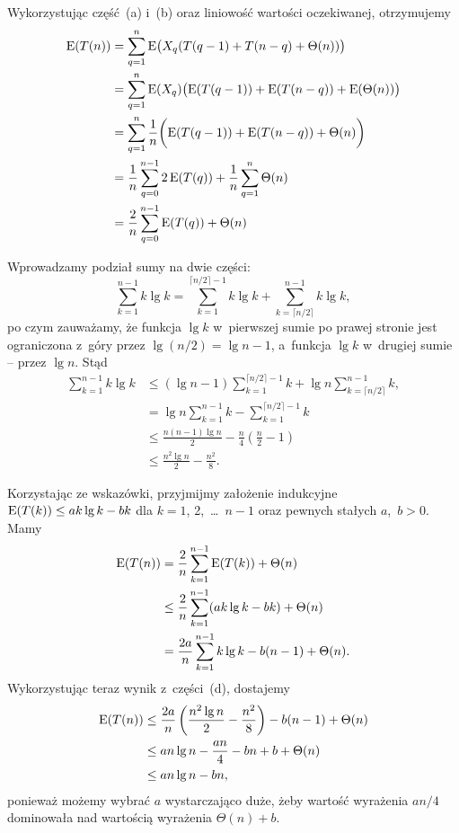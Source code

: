 \subproblem %
Wykorzystując część~(a) i~(b) oraz liniowość wartości oczekiwanej, otrzymujemy
\begin{align*}
	\operatorname{E}(T(n)) &= \sum_{q=1}^n\operatorname{E}\bigl(X_q(T(q-1)+T(n-q)+\Theta(n))\bigr) \\
	&= \sum_{q=1}^n\operatorname{E}(X_q)\bigl(\operatorname{E}(T(q-1))+\operatorname{E}(T(n-q))+\operatorname{E}(\Theta(n))\bigr) \\
	&= \sum_{q=1}^n\frac{1}{n}\biggl(\operatorname{E}(T(q-1))+\operatorname{E}(T(n-q))+\Theta(n)\biggr) \\
	&= \frac{1}{n}\sum_{q=0}^{n-1}2\operatorname{E}(T(q))+\frac{1}{n}\sum_{q=1}^n\Theta(n) \\
	&= \frac{2}{n}\sum_{q=0}^{n-1}\operatorname{E}(T(q))+\Theta(n)
\end{align*}

\subproblem %
Wprowadzamy podział sumy na dwie części:
\[
	\sum_{k=1}^{n-1}k\lg k = \sum_{k=1}^{\lceil n/2\rceil-1}k\lg k+\sum_{k=\lceil n/2\rceil}^{n-1}k\lg k,
\]
po czym zauważamy, że funkcja $\lg k$ w~pierwszej sumie po prawej stronie jest ograniczona z~góry przez $\lg(n/2)=\lg n-1$, a~funkcja $\lg k$ w~drugiej sumie -- przez $\lg n$. Stąd
\begin{align*}
	\sum_{k=1}^{n-1}k\lg k &\le (\lg n-1)\sum_{k=1}^{\lceil n/2\rceil-1}k+\lg n\sum_{k=\lceil n/2\rceil}^{n-1}k, \\
	&= \lg n\sum_{k=1}^{n-1}k-\sum_{k=1}^{\lceil n/2\rceil-1}k \\[2mm]
	&\le \frac{n(n-1)\lg n}{2}-\frac{n}{4}\left(\frac{n}{2}-1\right) \\[1mm]
	&\le \frac{n^2\lg n}{2}-\frac{n^2}{8}.
\end{align*}

\subproblem %

\noindent Korzystając ze wskazówki, przyjmijmy założenie indukcyjne $\operatorname{E}(T(k))\le ak\lg k-bk$ dla $k=1$, 2,~\dots~$n-1$ oraz pewnych stałych $a$,~$b>0$. Mamy
\begin{align*}
	\operatorname{E}(T(n)) &= \frac{2}{n}\sum_{k=1}^{n-1}\operatorname{E}(T(k))+\Theta(n) \\
	&\le \frac{2}{n}\sum_{k=1}^{n-1}(ak\lg k-bk)+\Theta(n) \\
	&= \frac{2a}{n}\sum_{k=1}^{n-1}k\lg k-b(n-1)+\Theta(n).
\end{align*}
Wykorzystując teraz wynik z~części~(d), dostajemy
\begin{align*}
	\operatorname{E}(T(n)) &\le \frac{2a}{n}\left(\frac{n^2\lg n}{2}-\frac{n^2}{8}\right)-b(n-1)+\Theta(n) \\
	&\le an\lg n-\frac{an}{4}-bn+b+\Theta(n) \\
	&\le an\lg n-bn,
\end{align*}
ponieważ możemy wybrać $a$ wystarczająco duże, żeby wartość wyrażenia $an/4$ dominowała nad wartością wyrażenia $\Theta(n)+b$.

